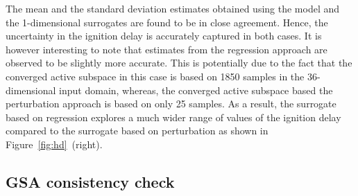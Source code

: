 %
The mean and the standard deviation estimates obtained using the model and the 1-dimensional surrogates
are found to be in close agreement. Hence, the uncertainty in the ignition delay is accurately captured 
in both cases.
It is however interesting to note that estimates from the regression approach are
observed to be slightly more accurate. This is potentially due to the fact that the 
converged active subspace in this case is 
based on 1850 samples in the 36-dimensional input domain, whereas, the converged active subspace based the 
perturbation approach is based on only 25 samples. As a result, the surrogate based on regression explores
a much wider range of values of the ignition delay compared to the surrogate based on perturbation as shown in
Figure~\ref{fig:hd}~(right).

\subsection{GSA consistency check}


